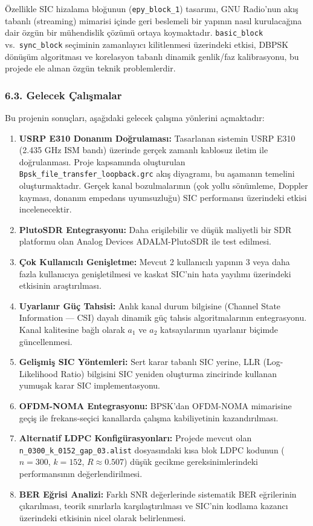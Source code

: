 \documentclass[
]{IEEEtran}
\begin{document}
Özellikle SIC hizalama bloğunun (\texttt{epy\_block\_1}) tasarımı, GNU
Radio'nun akış tabanlı (streaming) mimarisi içinde geri beslemeli bir
yapının nasıl kurulacağına dair özgün bir mühendislik çözümü ortaya
koymaktadır. \texttt{basic\_block} vs.~\texttt{sync\_block} seçiminin
zamanlayıcı kilitlenmesi üzerindeki etkisi, DBPSK dönüşüm algoritması ve
korelasyon tabanlı dinamik genlik/faz kalibrasyonu, bu projede ele
alınan özgün teknik problemlerdir.

\subsubsection{6.3. Gelecek
Çalışmalar}\label{gelecek-uxe7alux131ux15fmalar}

Bu projenin sonuçları, aşağıdaki gelecek çalışma yönlerini açmaktadır:

\begin{enumerate}
\def\labelenumi{\arabic{enumi}.}
\item
  \textbf{USRP E310 Donanım Doğrulaması:} Tasarlanan sistemin USRP E310
  (2.435 GHz ISM bandı) üzerinde gerçek zamanlı kablosuz iletim ile
  doğrulanması. Proje kapsamında oluşturulan
  \texttt{Bpsk\_file\_transfer\_loopback.grc} akış diyagramı, bu
  aşamanın temelini oluşturmaktadır. Gerçek kanal bozulmalarının (çok
  yollu sönümleme, Doppler kayması, donanım empedans uyumsuzluğu) SIC
  performansı üzerindeki etkisi incelenecektir.
\item
  \textbf{PlutoSDR Entegrasyonu:} Daha erişilebilir ve düşük maliyetli
  bir SDR platformu olan Analog Devices ADALM-PlutoSDR ile test
  edilmesi.
\item
  \textbf{Çok Kullanıcılı Genişletme:} Mevcut 2 kullanıcılı yapının 3
  veya daha fazla kullanıcıya genişletilmesi ve kaskat SIC'nin hata
  yayılımı üzerindeki etkisinin araştırılması.
\item
  \textbf{Uyarlanır Güç Tahsisi:} Anlık kanal durum bilgisine (Channel
  State Information --- CSI) dayalı dinamik güç tahsis algoritmalarının
  entegrasyonu. Kanal kalitesine bağlı olarak \(a_1\) ve \(a_2\)
  katsayılarının uyarlanır biçimde güncellenmesi.
\item
  \textbf{Gelişmiş SIC Yöntemleri:} Sert karar tabanlı SIC yerine, LLR
  (Log-Likelihood Ratio) bilgisini SIC yeniden oluşturma zincirinde
  kullanan yumuşak karar SIC implementasyonu.
\item
  \textbf{OFDM-NOMA Entegrasyonu:} BPSK'dan OFDM-NOMA mimarisine geçiş
  ile frekans-seçici kanallarda çalışma kabiliyetinin kazandırılması.
\item
  \textbf{Alternatif LDPC Konfigürasyonları:} Projede mevcut olan
  \texttt{n\_0300\_k\_0152\_gap\_03.alist} dosyasındaki kısa blok LDPC
  kodunun (\(n = 300\), \(k = 152\), \(R \approx 0.507\)) düşük gecikme
  gereksinimlerindeki performansının değerlendirilmesi.
\item
  \textbf{BER Eğrisi Analizi:} Farklı SNR değerlerinde sistematik BER
  eğrilerinin çıkarılması, teorik sınırlarla karşılaştırılması ve
  SIC'nin kodlama kazancı üzerindeki etkisinin nicel olarak
  belirlenmesi.
\end{enumerate}
\end{document}
